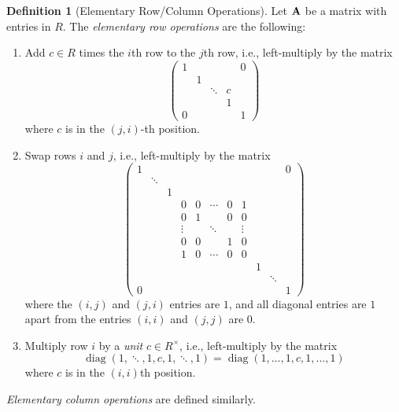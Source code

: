 \documentclass{article}
\theoremstyle{definition}
\newtheorem{definition}[theorem]{Definition}
\theoremstyle{remark}
\newcommand{\pqty}[1]{\left(#1\right)}
\newcommand{\pmqty}[1]{\begin{pmatrix}#1\end{pmatrix}}
\newcommand{\multiplicative}{^{\times}}
\newcommand{\diag}{\operatorname{diag}}
\begin{document}
\begin{definition}[Elementary Row/Column Operations]
    \label{def:elementary-row-column-operation}%
    Let \(\vb{A}\) be a matrix with entries in \(R\). The \emph{elementary row operations} are the following:
    \begin{enumerate}
        \item Add \(c \in R\) times the \(i\)th row to the \(j\)th row, i.e., left-multiply by the matrix
        \[
            \pmqty{
                1& & & &0\\
                 &1& & & \\
                 & &\ddots&c& \\
                 & & &1& \\
                0& & & &1
            }
        \]
        where \(c\) is in the \(\pqty{j, i}\)-th position.

        \item Swap rows \(i\) and \(j\), i.e., left-multiply by the matrix
        \[
            \pmqty{
                1& & & & & & & & & &0\\
                 & \ddots & & & & & & & & & \\
                 & &1& & & & & & & & \\
                 & & &0&0&\cdots&0&1& & & \\
                 & & &0&1& &0&0& & & \\
                 & & &\vdots& & \ddots & & \vdots & & & \\
                 & & &0&0& &1&0& & & \\
                 & & &1&0&\cdots&0&0& & & \\
                 & & & & & & & &1& & \\
                 & & & & & & & & & \ddots & \\
                0& & & & & & & & & &1
            }
        \]
        where the \(\pqty{i, j}\) and \(\pqty{j, i}\) entries are \(1\), and all diagonal entries are \(1\) apart from the entries \(\pqty{i, i}\) and \(\pqty{j, j}\) are \(0\).

        \item Multiply row \(i\) by a \emph{unit} \(c \in R\multiplicative\), i.e., left-multiply by the matrix
        \[
            \operatorname{diag}\pqty{1, \ddots, 1, c, 1, \ddots, 1} = \diag\pqty{1, \ldots, 1, c, 1, \ldots, 1}
        \]
        where \(c\) is in the \(\pqty{i, i}\)th position.
    \end{enumerate}

    \emph{Elementary column operations} are defined similarly.
\end{definition}
\end{document}
